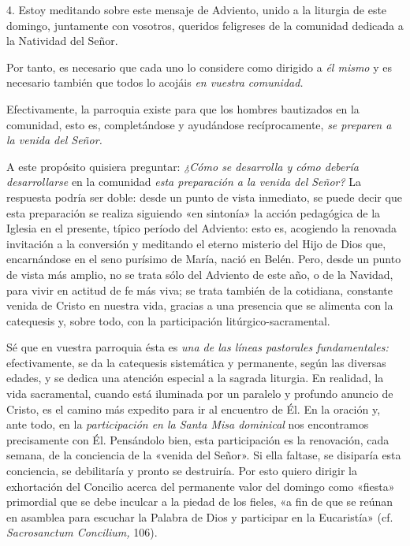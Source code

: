 \documentclass[]{article}
\begin{document}
4. Estoy meditando sobre este mensaje de Adviento, unido a la liturgia
de este domingo, juntamente con vosotros, queridos feligreses de la
comunidad dedicada a la Natividad del Señor.

Por tanto, es necesario que cada uno lo considere como dirigido a
\emph{él mismo} y es necesario también que todos lo acojáis \emph{en
vuestra comunidad.}

Efectivamente, la parroquia existe para que los hombres bautizados en la
comunidad, esto es, completándose y ayudándose recíprocamente, \emph{se
preparen a la venida del Señor.}

A este propósito quisiera preguntar: \emph{¿Cómo se desarrolla y cómo
debería desarrollarse} en la comunidad \emph{esta preparación a la
venida del Señor?} La respuesta podría ser doble: desde un punto de
vista inmediato, se puede decir que esta preparación se realiza
siguiendo «en sintonía» la acción pedagógica de la Iglesia en el
presente, típico período del Adviento: esto es, acogiendo la renovada
invitación a la conversión y meditando el eterno misterio del Hijo de
Dios que, encarnándose en el seno purísimo de María, nació en Belén.
Pero, desde un punto de vista más amplio, no se trata sólo del Adviento
de este año, o de la Navidad, para vivir en actitud de fe más viva; se
trata también de la cotidiana, constante venida de Cristo en nuestra
vida, gracias a una presencia que se alimenta con la catequesis y, sobre
todo, con la participación litúrgico-sacramental.

Sé que en vuestra parroquia ésta es \emph{una de las líneas pastorales
fundamentales:} efectivamente, se da la catequesis sistemática y
permanente, según las diversas edades, y se dedica una atención especial
a la sagrada liturgia. En realidad, la vida sacramental, cuando está
iluminada por un paralelo y profundo anuncio de Cristo, es el camino más
expedito para ir al encuentro de Él. En la oración y, ante todo, en la
\emph{participación en la Santa Misa dominical} nos encontramos
precisamente con Él. Pensándolo bien, esta participación es la
renovación, cada semana, de la conciencia de la «venida del Señor». Si
ella faltase, se disiparía esta conciencia, se debilitaría y pronto se
destruiría. Por esto quiero dirigir la exhortación del Concilio acerca
del permanente valor del domingo como «fiesta» primordial que se debe
inculcar a la piedad de los fieles, «a fin de que se reúnan en asamblea
para escuchar la Palabra de Dios y participar en la Eucaristía» (cf.
\emph{Sacrosanctum Concilium,} 106).
\end{document}
